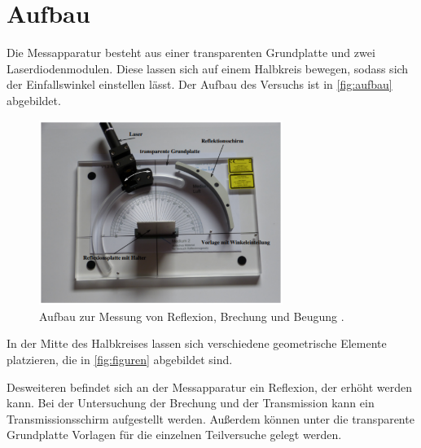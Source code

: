 \section{Aufbau}
\label{sec:Aufbau}

Die Messapparatur besteht aus einer transparenten Grundplatte und zwei Laserdiodenmodulen.
Diese lassen sich auf einem Halbkreis bewegen, sodass sich der Einfallswinkel einstellen
lässt. Der Aufbau des Versuchs ist in \autoref{fig:aufbau} abgebildet. 

\begin{figure}
    \centering
    \includegraphics[height = 6cm]{Aufbau.pdf}
    \caption{Aufbau zur Messung von Reflexion, Brechung und Beugung \cite{ap400}.}
    \label{fig:aufbau}
\end{figure}

In der Mitte des Halbkreises lassen sich verschiedene geometrische Elemente platzieren,
die in \autoref{fig:figuren} abgebildet sind. 

Desweiteren befindet sich an der Messapparatur ein Reflexion, der erhöht werden kann.
Bei der Untersuchung der Brechung und der Transmission kann ein Transmissionsschirm 
aufgestellt werden. Außerdem können unter die transparente Grundplatte Vorlagen für
die einzelnen Teilversuche gelegt werden.